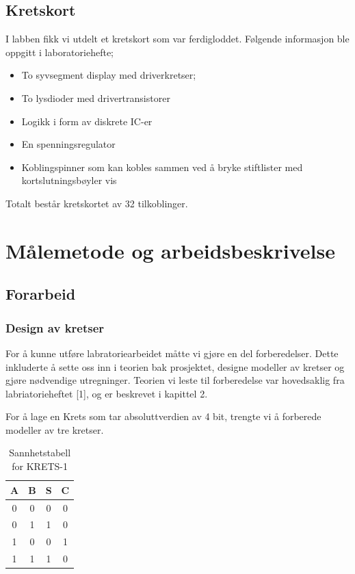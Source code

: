 \documentclass{article}
\begin{document}
\subsection{Kretskort}
I labben fikk vi utdelt et kretskort som var ferdigloddet. Følgende informasjon ble oppgitt i laboratoriehefte;
\begin{itemize}
	\item To syvsegment display med driverkretser;
	\item To lysdioder med drivertransistorer
	\item Logikk i form av diskrete IC-er
	\item En spenningsregulator
	\item Koblingspinner som kan kobles sammen ved å bryke stiftlister med kortslutningsbøyler
	vis
\end{itemize}
Totalt består kretskortet av 32 tilkoblinger.


\section{Målemetode og arbeidsbeskrivelse}

\subsection{Forarbeid}
\subsubsection{Design av kretser}
For å kunne utføre labratoriearbeidet måtte vi gjøre en del forberedelser. Dette inkluderte å sette oss inn i teorien bak prosjektet, designe modeller av kretser og gjøre nødvendige utregninger. Teorien vi leste til forberedelse var hovedsaklig fra labriatorieheftet [1], og er beskrevet i kapittel 2.

For å lage en Krets som tar absoluttverdien av 4 bit, trengte vi å forberede modeller av tre kretser.

\begin{table}[h]
	\centering
	\caption{Sannhetstabell for KRETS-1}
	\label{tab:sannhet1}
	\vspace{0.2cm}
	\begin{tabular} {| c | c | c | c |} \hline
		A & B & S & C \\ \hline
		0 & 0 & 0 & 0 \\ \hline
		0 & 1 & 1 & 0 \\ \hline
		1 & 0 & 0 & 1 \\ \hline
		1 & 1 & 1 & 0 \\ \hline
	\end{tabular}
\end{table}
\end{document}
